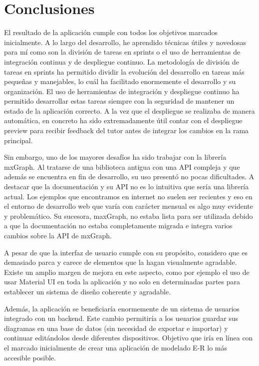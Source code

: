 
\section{Conclusiones}

El resultado de la aplicación cumple con todos los objetivos marcados inicialmente. A lo largo del desarrollo, he aprendido técnicas útiles y novedosas para mí como son la división de tareas en sprints o el uso de herramientas de integración continua y de despliegue continuo.
La metodología de división de tareas en sprints ha permitido dividir la evolución del desarrollo en tareas más pequeñas y manejables, lo cuál ha facilitado enormemente el desarrollo y su organización.
El uso de herramientas de integración y despliegue continuo ha permitido desarrollar estas tareas siempre con la seguridad de mantener un estado de la aplicación correcto. A la vez que el despliegue se realizaba de manera automática, en concreto ha sido extremadamente útil contar con el despliegue preview para recibir feedback del tutor antes de integrar los cambios en la rama principal.

Sin embargo, uno de los mayores desafíos ha sido trabajar con la librería mxGraph. Al tratarse de una biblioteca antigua con una API compleja y que además se encuentra en fin de desarrollo, su uso presentó no pocas dificultades. A destacar que la documentación y su API no es lo intuitiva que sería una librería actual. Los ejemplos que encontramos en internet no suelen ser recientes y eso en el entorno de desarrollo web que varía con carácter mensual es algo muy evidente y problemático.
Su sucesora, maxGraph, no estaba lista para ser utilizada debido a que la documentación no estaba completamente migrada e integra varios cambios sobre la API de mxGraph.

A pesar de que la interfaz de usuario cumple con su propósito, considero que es demasiado parca y carece de elementos que la hagan visualmente agradable. Existe un amplio margen de mejora en este aspecto, como por ejemplo el uso de usar Material UI en toda la aplicación y no solo en determinadas partes para establecer un sistema de diseño coherente y agradable.

Además, la aplicación se beneficiaría enormemente de un sistema de usuarios integrado con un backend. Este cambio permitiría a los usuarios guardar sus diagramas en una base de datos (sin necesidad de exportar e importar) y continuar editándolos desde diferentes dispositivos. Objetivo que iría en línea con el marcado inicialmente de crear una aplicación de modelado E-R lo más accesible posible.

